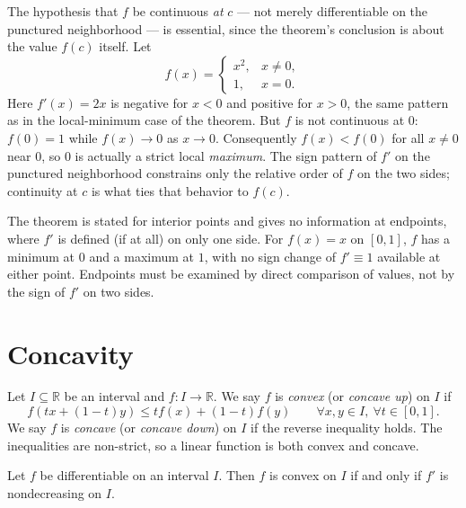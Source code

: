\documentclass{essay}
\begin{document}
\begin{remark}
The hypothesis that \(f\) be continuous \emph{at} \(c\) --- not merely
differentiable on the punctured neighborhood --- is essential, since the
theorem's conclusion is about the value \(f(c)\) itself. Let
\[
f(x)=\begin{cases} x^2, & x\neq 0,\\ 1, & x=0.\end{cases}
\]
Here \(f'(x)=2x\) is negative for \(x<0\) and positive for \(x>0\), the same
pattern as in the local-minimum case of the theorem. But \(f\) is not
continuous at \(0\): \(f(0)=1\) while \(f(x)\to 0\) as \(x\to 0\).
Consequently \(f(x)<f(0)\) for all \(x\neq0\) near \(0\), so \(0\) is
actually a strict local \emph{maximum}. The sign pattern of \(f'\) on the
punctured neighborhood constrains only the relative order of \(f\) on the
two sides; continuity at \(c\) is what ties that behavior to \(f(c)\).
\end{remark}

\begin{remark}[Endpoints]
The theorem is stated for interior points and gives no information at
endpoints, where \(f'\) is defined (if at all) on only one side. For
\(f(x)=x\) on \([0,1]\), \(f\) has a minimum at \(0\) and a maximum at
\(1\), with no sign change of \(f'\equiv1\) available at either point.
Endpoints must be examined by direct comparison of values, not by the sign
of \(f'\) on two sides.
\end{remark}

\section{Concavity}

\begin{definition}
Let \(I\subseteq\mathbb{R}\) be an interval and \(f:I\to\mathbb{R}\). We say
\(f\) is \emph{convex} (or \emph{concave up}) on \(I\) if
\[
f(tx+(1-t)y)\leq t f(x)+(1-t)f(y)
\qquad \forall x,y\in I,\ \forall t\in[0,1].
\]
We say \(f\) is \emph{concave} (or \emph{concave down}) on \(I\) if the
reverse inequality holds. The inequalities are non-strict, so a linear
function is both convex and concave.
\end{definition}

\begin{proposition}
Let \(f\) be differentiable on an interval \(I\). Then \(f\) is convex on
\(I\) if and only if \(f'\) is nondecreasing on \(I\).
\end{proposition}
\end{document}
